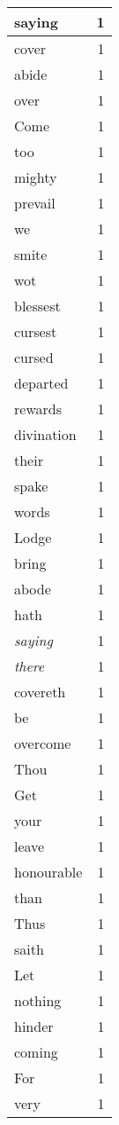 \begin{center}
\begin{longtable}{l|r}
saying & 1\\ \hline 
cover & 1\\ \hline 
abide & 1\\ \hline 
over & 1\\ \hline 
Come & 1\\ \hline 
too & 1\\ \hline 
mighty & 1\\ \hline 
prevail & 1\\ \hline 
we & 1\\ \hline 
smite & 1\\ \hline 
wot & 1\\ \hline 
blessest & 1\\ \hline 
cursest & 1\\ \hline 
cursed & 1\\ \hline 
departed & 1\\ \hline 
rewards & 1\\ \hline 
divination & 1\\ \hline 
their & 1\\ \hline 
spake & 1\\ \hline 
words & 1\\ \hline 
Lodge & 1\\ \hline 
bring & 1\\ \hline 
abode & 1\\ \hline 
hath & 1\\ \hline 
\emph{saying} & 1\\ \hline 
\emph{there} & 1\\ \hline 
covereth & 1\\ \hline 
be & 1\\ \hline 
overcome & 1\\ \hline 
Thou & 1\\ \hline 
Get & 1\\ \hline 
your & 1\\ \hline 
leave & 1\\ \hline 
honourable & 1\\ \hline 
than & 1\\ \hline 
Thus & 1\\ \hline 
saith & 1\\ \hline 
Let & 1\\ \hline 
nothing & 1\\ \hline 
hinder & 1\\ \hline 
coming & 1\\ \hline 
For & 1\\ \hline 
very & 1\\ \hline 

\end{longtable}
\end{center}
